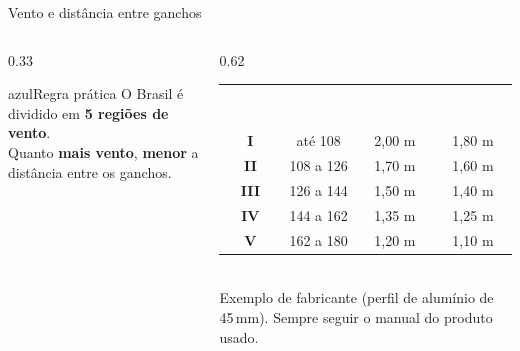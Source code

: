 \documentclass[aspectratio=169,10pt,xcolor=table]{beamer}
\newcommand{\cabecalho}{\rowcolor{azul}}
\newcommand{\tcab}[1]{\textcolor{white}{\bfseries #1}}
\begin{document}
\begin{frame}{Vento e distância entre ganchos}
  \begin{columns}[c]
    \begin{column}{0.33\textwidth}
      \begin{card}{azul}{\faWind\enspace Regra prática}
        O Brasil é dividido em \textbf{5 regiões de vento}.\\[0.3em]
        Quanto \textbf{mais vento}, \textbf{menor} a distância entre os ganchos.
      \end{card}
    \end{column}
    \begin{column}{0.62\textwidth}
      \centering\small
      \renewcommand{\arraystretch}{1.5}
      \begin{tabular}{>{\bfseries}c c c c}
        \cabecalho \tcab{Região} & \tcab{Vento (km/h)} & \tcab{Módulo 60 cél.} & \tcab{Módulo 72 cél.}\\
        I   & até 108    & 2,00 m & 1,80 m\\
        II  & 108 a 126  & 1,70 m & 1,60 m\\
        III & 126 a 144  & 1,50 m & 1,40 m\\
        IV  & 144 a 162  & 1,35 m & 1,25 m\\
        V   & 162 a 180  & 1,20 m & 1,10 m\\
      \end{tabular}\\[0.4em]
      {\scriptsize\color{cinza} Exemplo de fabricante (perfil de alumínio de 45\,mm). Sempre seguir o manual do produto usado.}
    \end{column}
  \end{columns}
\end{frame}
\end{document}
